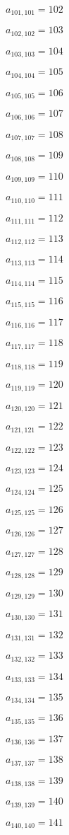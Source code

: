 \documentclass[a4paper,12pt]{article}
\begin{document}
$a _{ 101, 101 } = 102$

$a _{ 102, 102 } = 103$

$a _{ 103, 103 } = 104$

$a _{ 104, 104 } = 105$

$a _{ 105, 105 } = 106$

$a _{ 106, 106 } = 107$

$a _{ 107, 107 } = 108$

$a _{ 108, 108 } = 109$

$a _{ 109, 109 } = 110$

$a _{ 110, 110 } = 111$

$a _{ 111, 111 } = 112$

$a _{ 112, 112 } = 113$

$a _{ 113, 113 } = 114$

$a _{ 114, 114 } = 115$

$a _{ 115, 115 } = 116$

$a _{ 116, 116 } = 117$

$a _{ 117, 117 } = 118$

$a _{ 118, 118 } = 119$

$a _{ 119, 119 } = 120$

$a _{ 120, 120 } = 121$

$a _{ 121, 121 } = 122$

$a _{ 122, 122 } = 123$

$a _{ 123, 123 } = 124$

$a _{ 124, 124 } = 125$

$a _{ 125, 125 } = 126$

$a _{ 126, 126 } = 127$

$a _{ 127, 127 } = 128$

$a _{ 128, 128 } = 129$

$a _{ 129, 129 } = 130$

$a _{ 130, 130 } = 131$

$a _{ 131, 131 } = 132$

$a _{ 132, 132 } = 133$

$a _{ 133, 133 } = 134$

$a _{ 134, 134 } = 135$

$a _{ 135, 135 } = 136$

$a _{ 136, 136 } = 137$

$a _{ 137, 137 } = 138$

$a _{ 138, 138 } = 139$

$a _{ 139, 139 } = 140$

$a _{ 140, 140 } = 141$
\end{document}
